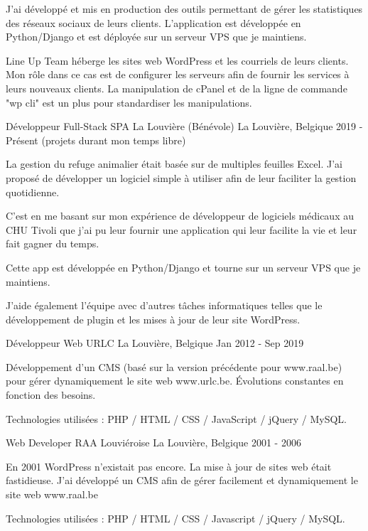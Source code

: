 \begin{cventries}
{    J'ai développé et mis en production des outils permettant de gérer les statistiques des réseaux sociaux de leurs clients. L'application est développée en Python/Django et est déployée sur un serveur VPS que je maintiens.
    
    Line Up Team héberge les sites web WordPress et les courriels de leurs clients. Mon rôle dans ce cas est de configurer les serveurs afin de fournir les services à leurs nouveaux clients. La manipulation de cPanel et de la ligne de commande "wp cli" est un plus pour standardiser les manipulations.

    }
    
    
  \cventry
    {Développeur Full-Stack} %
    {SPA La Louvière (Bénévole)} %
    {La Louvière, Belgique} %
    {2019 - Présent (projets durant mon temps libre)} %
    {
    La gestion du refuge animalier était basée sur de multiples feuilles Excel. J'ai proposé de développer un logiciel simple à utiliser afin de leur faciliter la gestion quotidienne.

    C'est en me basant sur mon expérience de développeur de logiciels médicaux au CHU Tivoli que j'ai pu leur fournir une application qui leur facilite la vie et leur fait gagner du temps.
    
    Cette app est développée en Python/Django et tourne sur un serveur VPS que je maintiens. 
    
    J'aide également l'équipe avec d'autres tâches informatiques telles que le développement de plugin et les mises à jour de leur site WordPress.

    }

  \cventry
    {Développeur Web} %
    {URLC} %
    {La Louvière, Belgique} %
    {Jan 2012 - Sep 2019} %
    {
    Développement d'un CMS (basé sur la version précédente pour www.raal.be) pour gérer dynamiquement le site web www.urlc.be.
    Évolutions constantes en fonction des besoins.

    Technologies utilisées : PHP / HTML / CSS / JavaScript / jQuery / MySQL.

    }

  \cventry
    {Web Developer} %
    {RAA Louviéroise} %
    {La Louvière, Belgique} %
    {2001 - 2006} %
    {
    En 2001 WordPress n'existait pas encore. La mise à jour de sites web était fastidieuse. J'ai développé un CMS afin de gérer facilement et dynamiquement le site web www.raal.be

Technologies utilisées : PHP / HTML / CSS / Javascript / jQuery / MySQL.

    }
\end{cventries}

